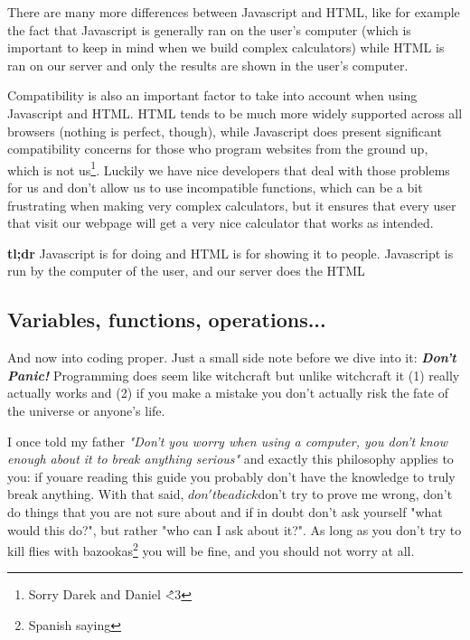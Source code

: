 There are many more differences between Javascript and HTML, like for example the fact that Javascript is generally ran on the user's computer (which is important to keep in mind when we build complex calculators) while HTML is ran on our server and only the results are shown in the user's computer. 

Compatibility is also an important factor to take into account when using Javascript and HTML. HTML tends to be much more widely supported across all browsers (nothing is perfect, though), while Javascript does present significant compatibility concerns for those who program websites from the ground up, which is not us\footnote{Sorry Darek and Daniel \^\^ <3}. Luckily we have nice developers that deal with those problems for us and don't allow us to use incompatible functions, which can be a bit frustrating when making very complex calculators, but it ensures that every user that visit our webpage will get a very nice calculator that works as intended.

\large{\textbf{tl;dr}}
Javascript is for doing and HTML is for showing it to people.
Javascript is run by the computer of the user, and our server does the HTML

\subsection{Variables, functions, operations...}
\label{sub:types}

And now into coding proper. Just a small side note before we dive into it: \textit{\textbf{Don't Panic!}} Programming does seem like witchcraft but unlike witchcraft it (1) really actually works and (2) if you make a mistake you don't actually risk the fate of the universe or anyone's life.

I once told my father \textit{"Don't you worry when using a computer, you don't know enough about it to break anything serious"} and exactly this philosophy applies to you: if youare reading this guide you probably don't have the knowledge to truly break anything. With that said, $don't be a dick$\texttrademark don't try to prove me wrong, don't do things that you are not sure about and if in doubt don't ask yourself "what would this do?", but rather "who can I ask about it?".  As long as you don't try to kill flies with bazookas\footnote{Spanish saying} you will be fine, and you should not worry at all.

